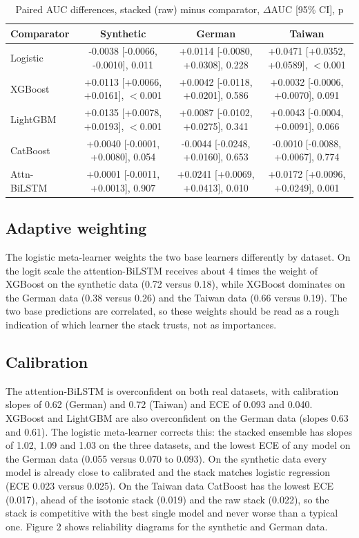 \documentclass[conference,a4paper]{IEEEtran}
\begin{document}
\begin{table}[!t]
\caption{Paired AUC differences, stacked (raw) minus comparator, $\Delta$AUC [95\% CI], p}
\centering
\footnotesize
\renewcommand{\arraystretch}{1.1}
\begin{tabular}{lccc}
\toprule
Comparator & Synthetic & German & Taiwan \\
\midrule
Logistic & -0.0038 [-0.0066, -0.0010], 0.011 & +0.0114 [-0.0080, +0.0308], 0.228 & +0.0471 [+0.0352, +0.0589], $<$0.001 \\
XGBoost & +0.0113 [+0.0066, +0.0161], $<$0.001 & +0.0042 [-0.0118, +0.0201], 0.586 & +0.0032 [-0.0006, +0.0070], 0.091 \\
LightGBM & +0.0135 [+0.0078, +0.0193], $<$0.001 & +0.0087 [-0.0102, +0.0275], 0.341 & +0.0043 [-0.0004, +0.0091], 0.066 \\
CatBoost & +0.0040 [-0.0001, +0.0080], 0.054 & -0.0044 [-0.0248, +0.0160], 0.653 & -0.0010 [-0.0088, +0.0067], 0.774 \\
Attn-BiLSTM & +0.0001 [-0.0011, +0.0013], 0.907 & +0.0241 [+0.0069, +0.0413], 0.010 & +0.0172 [+0.0096, +0.0249], 0.001 \\
\bottomrule
\end{tabular}
\end{table}

\subsection{Adaptive weighting}

The logistic meta-learner weights the two base learners differently by dataset. On the logit scale the attention-BiLSTM receives about 4 times the weight of XGBoost on the synthetic data (0.72 versus 0.18), while XGBoost dominates on the German data (0.38 versus 0.26) and the Taiwan data (0.66 versus 0.19). The two base predictions are correlated, so these weights should be read as a rough indication of which learner the stack trusts, not as importances.

\subsection{Calibration}

The attention-BiLSTM is overconfident on both real datasets, with calibration slopes of 0.62 (German) and 0.72 (Taiwan) and ECE of 0.093 and 0.040. XGBoost and LightGBM are also overconfident on the German data (slopes 0.63 and 0.61). The logistic meta-learner corrects this: the stacked ensemble has slopes of 1.02, 1.09 and 1.03 on the three datasets, and the lowest ECE of any model on the German data (0.055 versus 0.070 to 0.093). On the synthetic data every model is already close to calibrated and the stack matches logistic regression (ECE 0.023 versus 0.025). On the Taiwan data CatBoost has the lowest ECE (0.017), ahead of the isotonic stack (0.019) and the raw stack (0.022), so the stack is competitive with the best single model and never worse than a typical one. Figure 2 shows reliability diagrams for the synthetic and German data.
\end{document}
